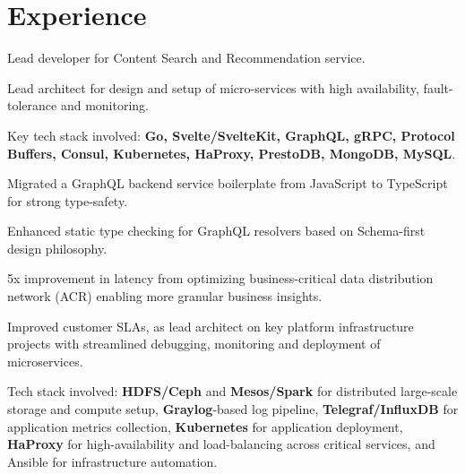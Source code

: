 \documentclass[]{deedy-resume-openfont}
\begin{document}
\begin{minipage}[t]{0.66\textwidth} 


\section{Experience}
\vspace{\topsep}
\begin{tightemize}
\item Lead developer for Content Search and Recommendation service.
\item Lead architect for design and setup of micro-services with high availability, fault-tolerance and monitoring.
\item Key tech stack involved: \textbf{Go, Svelte/SvelteKit, GraphQL, gRPC, Protocol Buffers, Consul, Kubernetes, HaProxy, PrestoDB, MongoDB, MySQL}.
\end{tightemize}
\sectionsep
{}
\vspace{\topsep}
\begin{tightemize}
\item Migrated a GraphQL backend service boilerplate from JavaScript to TypeScript for strong type-safety.
\item Enhanced static type checking for GraphQL resolvers based on Schema-first design philosophy.
\end{tightemize}
\sectionsep
{}
\begin{tightemize}
\item 5x improvement in latency from optimizing business-critical data distribution network (ACR) enabling more granular business insights.
\item Improved customer SLAs, as lead architect on key platform infrastructure projects with streamlined debugging, monitoring and deployment of microservices. 
\item Tech stack involved: \textbf{HDFS/Ceph} and \textbf{Mesos/Spark} for distributed large-scale storage and compute setup, \textbf{Graylog}-based log pipeline, \textbf{Telegraf/InfluxDB} for application metrics collection, \textbf{Kubernetes} for application deployment, \textbf{HaProxy} for high-availability and load-balancing across critical services, and Ansible for infrastructure automation.
\end{tightemize}
\sectionsep


\end{minipage}
\end{document}
